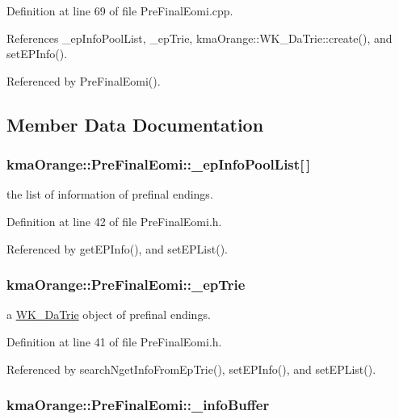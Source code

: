 Definition at line 69 of file PreFinalEomi.cpp.

References \_\-epInfoPoolList, \_\-epTrie, kmaOrange::WK\_\-DaTrie::create(), and setEPInfo().

Referenced by PreFinalEomi().

\subsection{Member Data Documentation}
\hypertarget{classkmaOrange_1_1PreFinalEomi_46182b8344e9473063fb358b92b9c621}{
\subsubsection[{\_\-epInfoPoolList}]{ {\bf kmaOrange::PreFinalEomi::\_\-epInfoPoolList}\mbox{[}$\,$\mbox{]}}}
\label{classkmaOrange_1_1PreFinalEomi_46182b8344e9473063fb358b92b9c621}


the list of information of prefinal endings. 



Definition at line 42 of file PreFinalEomi.h.

Referenced by getEPInfo(), and setEPList().\hypertarget{classkmaOrange_1_1PreFinalEomi_9e5980dd69c616faaec5fb08880f75cf}{
\subsubsection[{\_\-epTrie}]{ {\bf kmaOrange::PreFinalEomi::\_\-epTrie}}}
\label{classkmaOrange_1_1PreFinalEomi_9e5980dd69c616faaec5fb08880f75cf}


a \hyperlink{classkmaOrange_1_1WK__DaTrie}{WK\_\-DaTrie} object of prefinal endings. 



Definition at line 41 of file PreFinalEomi.h.

Referenced by searchNgetInfoFromEpTrie(), setEPInfo(), and setEPList().\hypertarget{classkmaOrange_1_1PreFinalEomi_a9ab313b35d695007b75dcc6ed704cba}{
\subsubsection[{\_\-infoBuffer}]{ {\bf kmaOrange::PreFinalEomi::\_\-infoBuffer}}}
\label{classkmaOrange_1_1PreFinalEomi_a9ab313b35d695007b75dcc6ed704cba}


